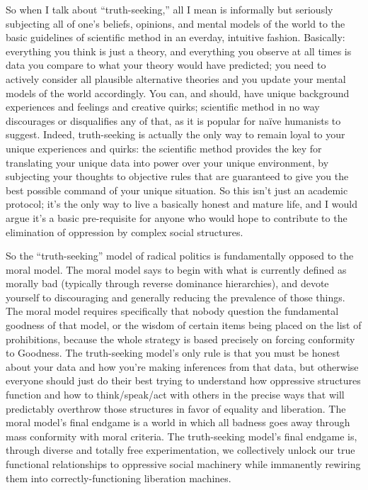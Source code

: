 \documentclass[a4paper,12pt,margin=.5in]{article}
\begin{document}
So when I talk about ``truth-seeking,'' all I mean is informally but
seriously subjecting all of one's beliefs, opinions, and mental models
of the world to the basic guidelines of scientific method in an everday,
intuitive fashion. Basically: everything you think is just a theory, and
everything you observe at all times is data you compare to what your
theory would have predicted; you need to actively consider all plausible
alternative theories and you update your mental models of the world
accordingly. You can, and should, have unique background experiences and
feelings and creative quirks; scientific method in no way discourages or
disqualifies any of that, as it is popular for naïve humanists to
suggest. Indeed, truth-seeking is actually the only way to remain loyal
to your unique experiences and quirks: the scientific method provides
the key for translating your unique data into power over your unique
environment, by subjecting your thoughts to objective rules that are
guaranteed to give you the best possible command of your unique
situation. So this isn't just an academic protocol; it's the only way to
live a basically honest and mature life, and I would argue it's a basic
pre-requisite for anyone who would hope to contribute to the elimination
of oppression by complex social structures.

So the ``truth-seeking'' model of radical politics is fundamentally
opposed to the moral model. The moral model says to begin with what is
currently defined as morally bad (typically through reverse dominance
hierarchies), and devote yourself to discouraging and generally reducing
the prevalence of those things. The moral model requires specifically
that nobody question the fundamental goodness of that model, or the
wisdom of certain items being placed on the list of prohibitions,
because the whole strategy is based precisely on forcing conformity to
Goodness. The truth-seeking model's only rule is that you must be honest
about your data and how you're making inferences from that data, but
otherwise everyone should just do their best trying to understand how
oppressive structures function and how to think/speak/act with others in
the precise ways that will predictably overthrow those structures in
favor of equality and liberation. The moral model's final endgame is a
world in which all badness goes away through mass conformity with moral
criteria. The truth-seeking model's final endgame is, through diverse
and totally free experimentation, we collectively unlock our true
functional relationships to oppressive social machinery while immanently
rewiring them into correctly-functioning liberation machines.
\end{document}
